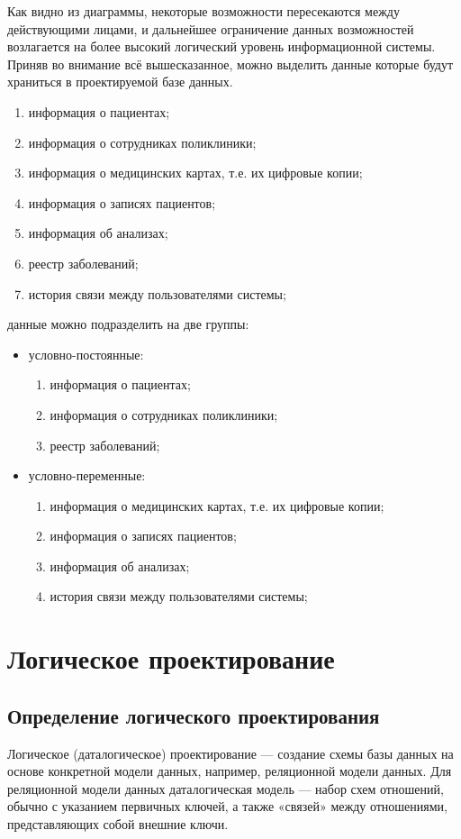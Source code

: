 \documentclass[14pt,a4paper,russian]{extreport}
\begin{document}
Как видно из диаграммы, некоторые возможности пересекаются между действующими лицами, и
дальнейшее ограничение данных возможностей возлагается на более высокий логический уровень
информационной системы.
\newpage
Приняв во внимание всё вышесказанное, можно выделить данные которые будут храниться в проектируемой
базе данных.
\begin{enumerate}[noitemsep]
    \item информация о пациентах;
    \item информация о сотрудниках поликлиники;
    \item информация о медицинских картах, т.е. их цифровые копии;
    \item информация о записях пациентов;
    \item информация об анализах;
    \item реестр заболеваний;
    \item история связи между пользователями системы;
\end{enumerate}

 данные можно подразделить на две группы:
\begin{itemize}[noitemsep]
    \item условно-постоянные:
        \begin{enumerate}[noitemsep]
            \item информация о пациентах;
            \item информация о сотрудниках поликлиники;
            \item реестр заболеваний;
        \end{enumerate}
    \item условно-переменные:
        \begin{enumerate}[noitemsep]
            \item информация о медицинских картах, т.е. их цифровые копии;
            \item информация о записях пациентов;
            \item информация об анализах;
            \item история связи между пользователями системы;
        \end{enumerate}
\end{itemize}


\chapter{Логическое проектирование}
\section{Определение логического проектирования}
Логическое (даталогическое) проектирование — создание схемы базы данных на основе конкретной модели
данных, например, реляционной модели данных. Для реляционной модели данных даталогическая модель —
набор схем отношений, обычно с указанием первичных ключей, а также «связей» между
отношениями, представляющих собой внешние ключи.
\end{document}

